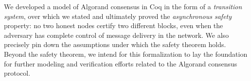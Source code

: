 We developed a model of Algorand consensus in Coq in the form of a \emph{transition system}, over which we stated and ultimately proved the \emph{asynchronous safety} property: no two honest nodes certify two different blocks, even when the adversary has complete control of message delivery in the network. We also precisely pin down the assumptions under which the safety theorem holds. Beyond the safety theorem, we intend for this formalization to lay the foundation for further modeling and verification efforts related to the Algorand consensus protocol.





